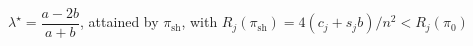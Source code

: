 \(\lambda^\star=\dfrac{a-2b}{a+b}\), attained by \(\pi_{\mathrm{sh}}\), with \(R_j(\pi_{\mathrm{sh}})=4(c_j+s_jb)/n^2<R_j(\pi_0)\)